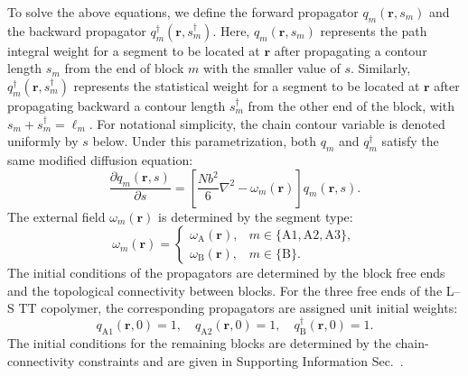     To solve the above equations, we define the forward propagator $q_m(\bm r,s_m)$ and the backward propagator $q_m^\dagger(\bm r,s_m^\dagger)$.
    Here, $q_m(\bm r,s_m)$ represents the path integral weight for a segment to be located at $\bm r$ after propagating a contour length $s_m$ from the end of block $m$ with the smaller value of $s$.
    Similarly, $q_m^\dagger(\bm r,s_m^\dagger)$ represents the statistical weight for a segment to be located at $\bm r$ after propagating backward a contour length $s_m^\dagger$ from the other end of the block, with $s_m+s_m^\dagger=\ell_m$.
    For notational simplicity, the chain contour variable is denoted uniformly by $s$ below.
    Under this parametrization, both $q_m$ and $q_m^\dagger$ satisfy the same modified diffusion equation:
    \begin{equation}
        \frac{\partial q_m(\bm r, s)}{\partial s}
        =
        \left[
            \frac{N b^2}{6}\nabla^2 - \omega_m(\bm r)
        \right]
        q_m(\bm r, s).
    \end{equation}
    The external field $\omega_m(\bm r)$ is determined by the segment type:
    \begin{equation}
        \omega_m(\bm r)=
            \begin{cases}
                \omega_{\mathrm A}(\bm r),
                & m \in \{\mathrm{A1},\mathrm{A2},\mathrm{A3}\}, \\
                \omega_{\mathrm B}(\bm r),
                & m \in \{\mathrm{B}\}.
            \end{cases}
    \end{equation}
    The initial conditions of the propagators are determined by the block free ends and the topological connectivity between blocks.
    For the three free ends of the L--S TT copolymer, the corresponding propagators are assigned unit initial weights:
    \begin{equation}
        q_{\mathrm{A1}}(\bm r,0)=1,\quad
        q_{\mathrm{A2}}(\bm r,0)=1,\quad
        q_{\mathrm B}^\dagger(\bm r,0)=1.
    \end{equation}
    The initial conditions for the remaining blocks are determined by the chain-connectivity constraints and are given in Supporting Information Sec.~.


